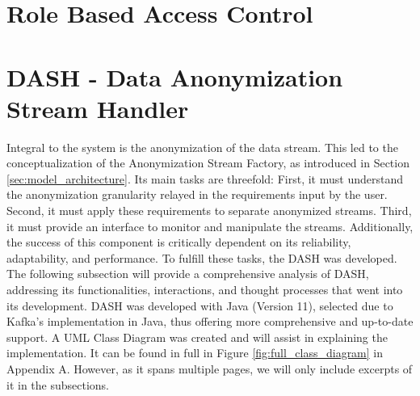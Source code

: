 \section{Role Based Access Control}


\section{DASH - Data Anonymization Stream Handler}
Integral to the system is the anonymization of the data stream. This led to the conceptualization of the Anonymization Stream Factory, as introduced in Section \ref{sec:model_architecture}. Its main tasks are threefold: First, it must understand the anonymization granularity relayed in the requirements input by the user. Second, it must apply these requirements to separate anonymized streams. Third, it must provide an interface to monitor and manipulate the streams. Additionally, the success of this component is critically dependent on its reliability, adaptability, and performance. To fulfill these tasks, the \acf{DASH} was developed. The following subsection will provide a comprehensive analysis of \ac{DASH}, addressing its functionalities, interactions, and thought processes that went into its development. \ac{DASH} was developed with Java (Version 11), selected due to Kafka's implementation in Java, thus offering more comprehensive and up-to-date support. A UML Class Diagram was created and will assist in explaining the implementation. It can be found in full in Figure \ref{fig:full_class_diagram} in Appendix A. However, as it spans multiple pages, we will only include excerpts of it in the subsections. 

